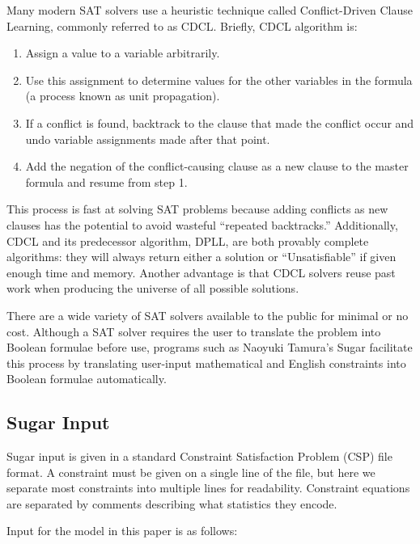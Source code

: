 \documentclass[runningheads]{llncs}
\begin{document}
Many modern SAT solvers use a heuristic technique called Conflict-Driven
Clause Learning, commonly referred to as CDCL\cite{cdcl}. Briefly, CDCL algorithm
is:

\begin{enumerate}

\item Assign a value to a variable arbitrarily.
\item Use this assignment to determine values for the other variables
  in the formula (a process known as unit propagation).
\item If a conflict is found, backtrack to the clause that made the
  conflict occur and undo variable assignments made after that point.
\item Add the negation of the conflict-causing clause as a new clause
  to the master formula and resume from step 1.

\end{enumerate}

This process is fast at solving SAT problems because adding conflicts as new clauses
has the potential to avoid wasteful ``repeated backtracks.''
Additionally, CDCL and its predecessor algorithm, DPLL, are both
provably complete algorithms: they will always return either a solution
or ``Unsatisfiable'' if given enough time and memory. Another
advantage is that CDCL solvers reuse past work when producing the universe of all
possible solutions.

There are a wide variety of SAT solvers available to the public for
minimal or no cost. Although a SAT solver requires the user to
translate the problem into Boolean formulae before use, programs such
as Naoyuki Tamura's Sugar facilitate this process by translating
user-input mathematical and English constraints into Boolean formulae
automatically.

\subsection{Sugar Input}

Sugar input is given in a standard Constraint Satisfaction Problem
(CSP) file format. A constraint must be given on a single line of the
file, but here we separate most constraints into multiple lines for
readability. Constraint equations are separated by comments describing
what statistics they encode.

Input for the model in this paper is as follows:

\end{document}
